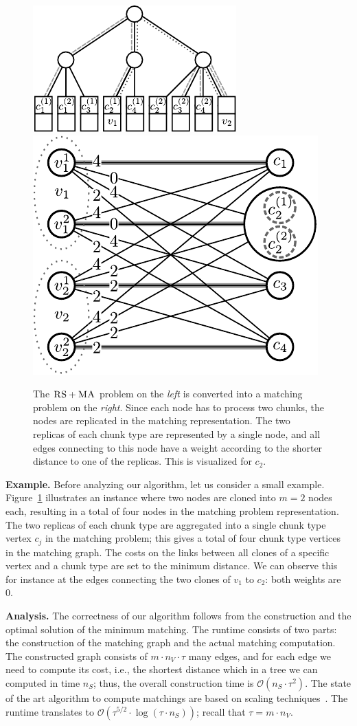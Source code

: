 \documentclass[preprint,12pt]{elsarticle}
\newcommand{\MaFactor}{m}
\newcommand{\ChunkType}{\tau}
\newcommand{\VirtualNode}{v}
\newcommand{\achunk}{\ensuremath{c}}
\newcommand{\RS}{\textsc{RS}}
\newcommand{\MA}{\textsc{MA}}
\begin{document}
\begin{figure}
\includegraphics[width = 0.49\columnwidth]{figs/model_ma_r_cv_boxes}
\hfill
\includegraphics[width =0.49\columnwidth]{figs/matching}
\caption{The $\RS+\MA$ problem on the \emph{left} is converted into a
matching problem on the \emph{right}. Since each node has to process two
chunks, the
nodes are replicated in the matching representation. The two replicas of each
chunk type are represented by a single node, and all edges connecting to this
node have a weight according to the shorter distance to one of the replicas.
This is visualized for $\achunk_2$.}
\label{fig:matching}
\end{figure}

\textbf{Example.} Before analyzing our algorithm, let us consider a small example.
Figure~\ref{fig:matching} illustrates
an instance where two nodes are
cloned into $\MaFactor = 2$ nodes each,
resulting in a total of four nodes in
the matching problem representation.
The two replicas of each chunk type are
aggregated into a single chunk type vertex $\achunk_j$  in the matching problem;
this gives a total of four chunk type vertices in the matching graph. The costs
on the links between all clones of a specific vertex and a chunk type are set to
the minimum distance. We can observe this for instance at the edges connecting
the two clones of $\VirtualNode_1$ to $\achunk_2$: both weights are 0.

\textbf{Analysis.}
The correctness of our algorithm follows from the construction and the optimal
solution of the minimum matching.
The runtime consists of two parts: the construction of the matching graph and
the actual matching computation. The constructed graph consists of
$\MaFactor \cdot n_V \cdot \ChunkType$
many edges,
and for each edge we need to compute its cost, i.e., the shortest distance
which in a tree we can computed in time $n_S$; thus, the overall construction time
is
$\mathcal{O}(n_S \cdot \tau^2)$.
The state of the art algorithm to compute matchings are based on scaling techniques~\cite{scale-match}.
The runtime translates to
$\mathcal{O}(\tau^{5/2}\cdot \log(\tau\cdot n_S))$; recall that $\tau = \MaFactor\cdot n_V$.
\end{document}
